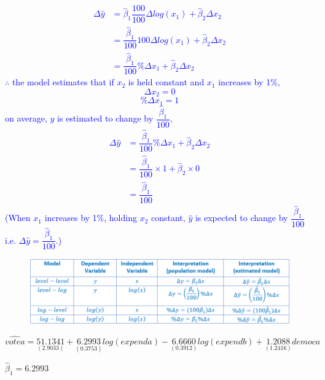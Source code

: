 \documentclass[12pt]{report}
\newenvironment{blueframed}[1][blue]
{\def\FrameCommand{\fboxsep=\FrameSep\fcolorbox{#1}{white}}%
	\MakeFramed {\advance\hsize-\width \FrameRestore}}
{\endMakeFramed}
\begin{document}
\justify
\begin{blueframed}
	\vspace{-\baselineskip}
	\justify
	\noindent \textcolor{blue}
	{
		\begin{align*}
		\Delta \hat{y} &= \hat{\beta}_1\dfrac{100}{100}\Delta log(x_1) + \hat{\beta}_2\Delta x_2 \\
		&= \dfrac{\hat{\beta}_1}{100} 100\Delta log(x_1) + \hat{\beta}_2\Delta x_2 \\
		&= \dfrac{\hat{\beta}_1}{100} \%\Delta x_1 + \hat{\beta}_2\Delta x_2
		\end{align*}
		$\therefore$ the model estimates that if $x_2$ is held constant and $x_1$ increases by 1\%, $$\Delta x_2 = 0$$ $$\% \Delta x_1 = 1$$ on average, $y$ is estimated to change by $\dfrac{\hat{\beta}_1}{100}$, \begin{align*}
		\Delta \hat{y} &= \dfrac{\hat{\beta}_1}{100} \%\Delta x_1 + \hat{\beta}_2\Delta x_2 \\
		&= \dfrac{\hat{\beta}_1}{100} \times 1 + \hat{\beta}_2 \times 0 \\
		&= \dfrac{\hat{\beta}_1}{100}
		\end{align*} (When $x_1$ increases by 1\%, holding $x_2$ constant, $\hat{y}$ is expected to change by $\dfrac{\hat{\beta}_1}{100}$ i.e. $\Delta\hat{y} = \dfrac{\hat{\beta}_1}{100}$.)
	}
\end{blueframed}
\begin{figure}[H]
	\centerline{\includegraphics{tute7_q1_1}}
\end{figure}
\vspace{-\baselineskip}

\newpage
$$\widehat{votea} = \underset{(2.9033)}{51.1341} + \underset{(0.3753)}{6.2993}log(expenda) - \underset{(0.3912)}{6.6660}log(expendb) + \underset{(1.2416)}{1.2088}democa$$

\noindent $\hat{\beta}_1 = 6.2993$
\end{document}
